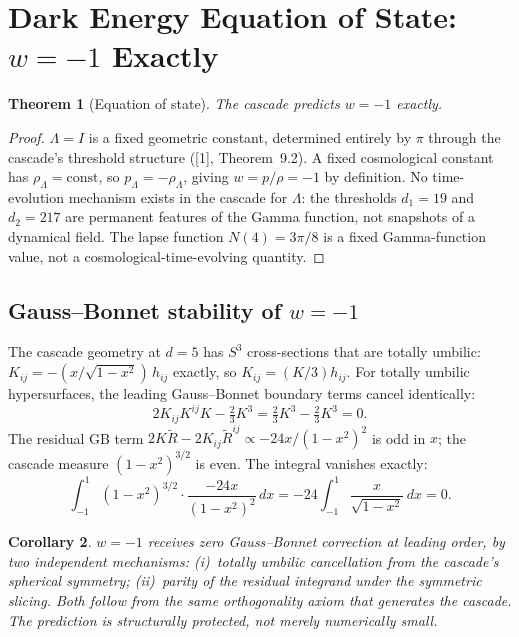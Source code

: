\documentclass[12pt,a4paper]{article}
\newtheorem{theorem}{Theorem}[section]
\newtheorem{corollary}[theorem]{Corollary}
\begin{document}
\section{Dark Energy Equation of State: $w = -1$ Exactly}

\begin{theorem}[Equation of state]
The cascade predicts $w = -1$ exactly.
\end{theorem}

\begin{proof}
$\Lambda = I$ is a fixed geometric constant, determined entirely by $\pi$ through the cascade's
threshold structure ([1], Theorem~9.2). A fixed cosmological constant has
$\rho_\Lambda = \text{const}$, so $p_\Lambda = -\rho_\Lambda$, giving $w = p/\rho = -1$ by definition.
No time-evolution mechanism exists in the cascade for $\Lambda$: the thresholds $d_1 = 19$ and
$d_2 = 217$ are permanent features of the Gamma function, not snapshots of a dynamical
field. The lapse function $N(4) = 3\pi/8$ is a fixed Gamma-function value, not a
cosmological-time-evolving quantity.
\end{proof}

\subsection{Gauss--Bonnet stability of $w = -1$}

The cascade geometry at $d = 5$ has $S^3$ cross-sections that are totally umbilic:
$K_{ij} = -(x/\sqrt{1-x^2})\,h_{ij}$ exactly, so $K_{ij} = (K/3)h_{ij}$. For totally umbilic
hypersurfaces, the leading Gauss--Bonnet boundary terms cancel identically:
\[
2K_{ij}K^{ij}K - \tfrac{2}{3}K^3 = \tfrac{2}{3}K^3 - \tfrac{2}{3}K^3 = 0.
\]
The residual GB term $2K\tilde{R} - 2K_{ij}\tilde{R}^{ij} \propto -24x/(1-x^2)^2$ is odd in $x$;
the cascade measure $(1-x^2)^{3/2}$ is even. The integral vanishes exactly:
\[
\int_{-1}^{1}(1-x^2)^{3/2}\cdot\frac{-24x}{(1-x^2)^2}\,dx
= -24\int_{-1}^{1}\frac{x}{\sqrt{1-x^2}}\,dx = 0.
\]

\begin{corollary}
$w = -1$ receives zero Gauss--Bonnet correction at leading order, by two independent
mechanisms: (i)~totally umbilic cancellation from the cascade's spherical symmetry;
(ii)~parity of the residual integrand under the symmetric slicing. Both follow from the
same orthogonality axiom that generates the cascade. The prediction is structurally
protected, not merely numerically small.
\end{corollary}
\end{document}
